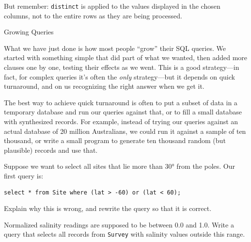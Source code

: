 \documentclass{book}
\begin{document}
But remember: \texttt{distinct} is applied to the values displayed in
the chosen columns, not to the entire rows as they are being processed.

\begin{swcbox}{Growing Queries}

What we have just done is how most people ``grow'' their SQL queries. We
started with something simple that did part of what we wanted, then
added more clauses one by one, testing their effects as we went. This is
a good strategy---in fact, for complex queries it's often the
\emph{only} strategy---but it depends on quick turnaround, and on us
recognizing the right answer when we get it.

The best way to achieve quick turnaround is often to put a subset of
data in a temporary database and run our queries against that, or to
fill a small database with synthesized records. For example, instead of
trying our queries against an actual database of 20 million Australians,
we could run it against a sample of ten thousand, or write a small
program to generate ten thousand random (but plausible) records and use
that.

\end{swcbox}

\begin{challenge}
  Suppose we want to select all sites that lie more than 30° from the
  poles. Our first query is:

\begin{verbatim}
select * from Site where (lat > -60) or (lat < 60);
\end{verbatim}

  Explain why this is wrong, and rewrite the query so that it is
  correct.
\end{challenge}

\begin{challenge}
  Normalized salinity readings are supposed to be between 0.0 and 1.0.
  Write a query that selects all records from \texttt{Survey} with
  salinity values outside this range.
\end{challenge}
\end{document}
